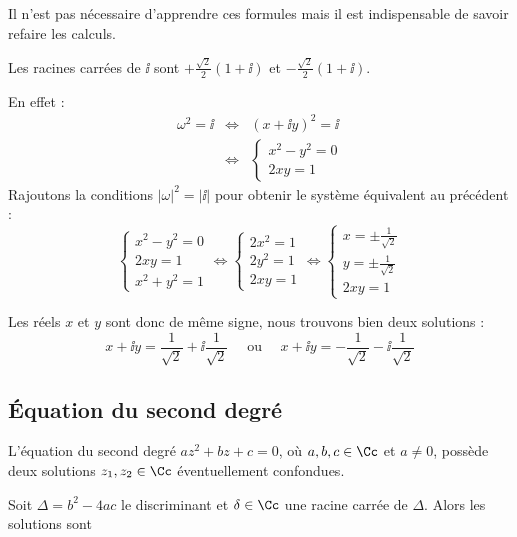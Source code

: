 \documentclass[class=report,crop=false]{standalone}
\begin{document}
Il n'est pas nécessaire d'apprendre ces formules mais il est indispensable
de savoir refaire les calculs.
\begin{exemple}
Les racines carrées de $\ii $ sont $+\frac{\sqrt{2}}{2}(1 + \ii)$ et $-\frac{\sqrt{2}}{2}(1 + \ii)$.

En effet :
\begin{eqnarray*}
  \omega^2 = \ii & \Longleftrightarrow & \left( x + \ii y \right)^2 = \ii \\
  & \Longleftrightarrow & \left\{ \begin{array}{l}
    x^2 - y^2 = 0\\
    2 xy = 1
  \end{array} \right.
\end{eqnarray*}
Rajoutons la conditions $|\omega|^2 = | \ii |$ pour obtenir le système équivalent au précédent :
\[ \left\{ \begin{array}{l}
     x^2 - y^2 = 0\\
     2 xy = 1\\
     x^2 + y^2 = 1
   \end{array} \right. \Longleftrightarrow \left\{ \begin{array}{l}
     2 x^2 = 1\\
     2 y^2 = 1\\
     2 xy = 1
   \end{array} \right. \Longleftrightarrow \left\{ \begin{array}{l}
     x = \pm \frac{1}{\sqrt{2}} \\
     y = \pm \frac{1}{\sqrt{2}} \\
     2 xy = 1
   \end{array} \right. \]

Les réels $x$ et $y$ sont donc de même signe, nous trouvons bien deux solutions :
$$x+\ii y = \frac{1}{\sqrt{2}} + \ii\frac{1}{\sqrt{2}}
\quad \text{ ou } \quad x+\ii y = -\frac{1}{\sqrt{2}} - \ii\frac{1}{\sqrt{2}}$$
\end{exemple}

\subsection{\'Equation du second degré}

\begin{proposition}
  L'équation du second degré $az^2 + bz + c = 0$, o\`u $a, b, c \in
  \Cc$ et $a \neq 0$, possède deux solutions $z_1, z_2 \in \Cc$
  éventuellement confondues.

  Soit $\Delta = b^2 - 4 ac$ le discriminant et
  $\delta \in \Cc$ une racine carrée de $\Delta$. Alors les
  solutions sont
\vspace{-0.5em}
\end{proposition}
\end{document}
